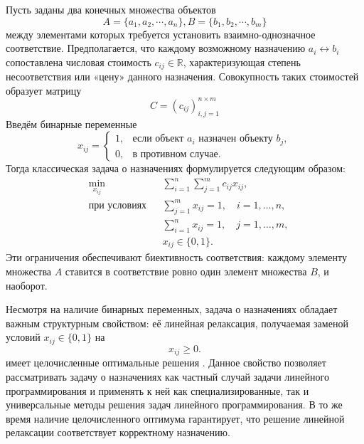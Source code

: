 Пусть заданы два конечных множества объектов
\[
    A = \{a_1, a_2, \cdots, a_n\}, B = \{b_1, b_2, \cdots, b_m \}
\]
между элементами которых требуется установить взаимно-однозначное соответствие. Предполагается, что каждому возможному назначению $a_i \leftrightarrow b_i$ сопоставлена числовая стоимость $c_{ij}\in\mathbb{R}$, характеризующая степень несоответствия или «цену» данного назначения. Совокупность таких стоимостей образует матрицу
\[
    C = (c_{ij})^{n\times m}_{i,j=1}
\]
Введём бинарные переменные
\[
    x_{ij} =
    \begin{cases}
        1, & \text{если объект } a_i \text{ назначен объекту } b_j, \\
        0, & \text{в противном случае}.
    \end{cases}
\]
Тогда классическая задача о назначениях формулируется следующим образом:
\[
    \begin{aligned}
         & \min_{x_{ij}}       &  & \sum_{i=1}^{n} \sum_{j=1}^{m} c_{ij} x_{ij}, \\
         & \text{при условиях} &  &
        \sum_{j=1}^{m} x_{ij} = 1, \quad i = 1, \dots, n,                        \\
         &                     &  &
        \sum_{i=1}^{n} x_{ij} = 1, \quad j = 1, \dots, m,                        \\
         &                     &  &
        x_{ij} \in \{0,1\}.
    \end{aligned}
\]
Эти ограничения обеспечивают биективность соответствия: каждому элементу множества $A$ ставится в соответствие ровно один элемент множества $B$, и наоборот.

Несмотря на наличие бинарных переменных, задача о назначениях обладает важным структурным свойством: её линейная релаксация, получаемая заменой условий $x_{ij}\in\{0, 1\}$ на
\[
    x_{ij} \geq 0.
\]
имеет целочисленные оптимальные решения \cite{lovasz1975ratio}. Данное свойство позволяет рассматривать задачу о назначениях как частный случай задачи линейного программирования и применять к ней как специализированные, так и универсальные методы решения задач линейного программирования. В то же время наличие целочисленного оптимума гарантирует, что решение линейной релаксации соответствует корректному назначению.

